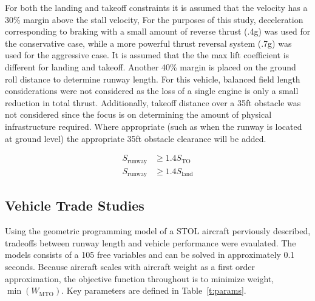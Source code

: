 \documentclass[]{aiaa-tc}%
\begin{document}
For both the landing and takeoff constraints it is assumed that the velocity has a 30\% margin above the stall velocity,
For the purposes of this study, deceleration corresponding to braking with a small amount of reverse thrust (.4g) was used for the conservative case, while a more powerful thrust reversal system (.7g) was used for the aggressive case. 
It is assumed that the the max lift coefficient is different for landing and takeoff.
Another 40\% margin is placed on the ground roll distance to determine runway length.  For this vehicle, balanced field length considerations were not considered as the loss of a single engine is only a small reduction in total thrust.  Additionally, takeoff distance over a 35ft obstacle was not considered since the focus is on determining the amount of physical infrastructure required.  Where appropriate (such as when the runway is located at ground level) the appropriate 35ft obstacle clearance will be added.  

\begin{align}
    S_{\mathrm{runway}} &\geq 1.4S_{\mathrm{TO}} \\
    S_{\mathrm{runway}} &\geq 1.4S_{\mathrm{land}} 
\end{align}

\subsection{Vehicle Trade Studies}

Using the geometric programming model of a STOL aircraft perviously described, tradeoffs between runway length and vehicle performance were evaulated.  The models consists of a 105 free variables and can be solved in approximately 0.1 seconds. 
Because aircraft scales with aircraft weight as a first order approximation, the objective function throughout is to minimize weight, $\min{(W_{\mathrm{MTO}})}$. 
Key parameters are defined in Table~\ref{t:params}.
\end{document}

